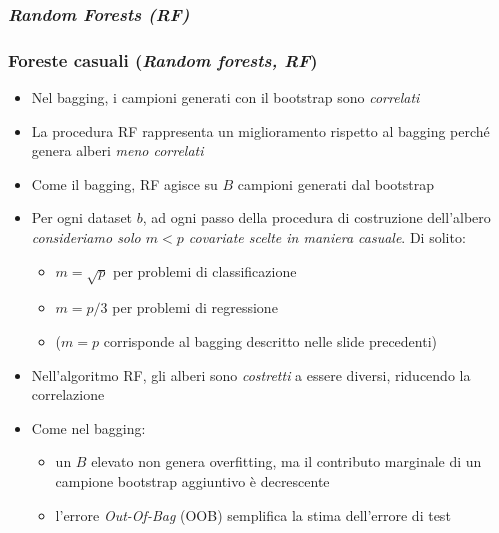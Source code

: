 \subsubsection[Random Forests (RF)]{\textit{Random Forests (RF)}}
\begin{frame}
	\frametitle{Foreste casuali (\emph{Random forests, RF})}
	
	\begin{itemize}
		\item Nel bagging, i campioni generati con il bootstrap sono \emph{correlati} %
		\item La procedura RF rappresenta un miglioramento rispetto al bagging perché genera alberi \emph{meno correlati}
		\item Come il bagging, RF agisce su $B$ campioni generati dal bootstrap
		\item Per ogni dataset $b$, ad ogni passo della procedura di costruzione dell'albero \emph{consideriamo solo $m<p$ covariate scelte in maniera casuale}. Di solito:
		    \begin{itemize}
			    \item $m=\sqrt{p}$ per problemi di classificazione
			    \item $m=p/3$ per problemi di regressione
			    \item ($m=p$ corrisponde al bagging descritto nelle slide precedenti)
		    \end{itemize}
		\item Nell'algoritmo RF, gli alberi sono \emph{costretti} a essere diversi, riducendo la correlazione
		\item Come nel bagging:
			\begin{itemize}
				\item un $B$ elevato non genera overfitting, ma il contributo marginale di un campione bootstrap aggiuntivo è decrescente
				\item l'errore \emph{Out-Of-Bag} (OOB) semplifica la stima dell'errore di test
			\end{itemize}
	\end{itemize}
\end{frame}


